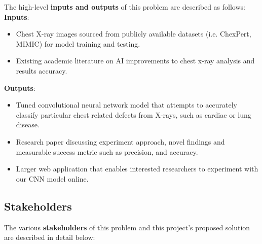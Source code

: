 \documentclass{article}
\begin{document}
The high-level \textbf{inputs and outputs} of this problem are described as follows:\\
\textbf{Inputs}:
\begin{itemize}
\item Chest X-ray images sourced from publicly available datasets (i.e. ChexPert, MIMIC) for model training and testing.
\item Existing academic literature on AI improvements to chest x-ray analysis and results accuracy.
\end{itemize}

\noindent \textbf{Outputs}:
\begin{itemize}
\item Tuned convolutional neural network model that attempts to accurately classify particular chest related defects from X-rays, such as cardiac or lung disease.
\item Research paper discussing experiment approach, novel findings and measurable success metric such as precision, and accuracy.
\item Larger web application that enables interested researchers to experiment with our CNN model online.

\end{itemize} 

\subsection{Stakeholders}

The various \textbf{stakeholders} of this problem and this project's proposed solution are described in detail below:
\end{document}
